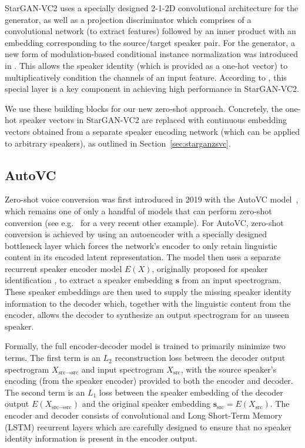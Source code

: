 StarGAN-VC2 uses a specially designed 2-1-2D convolutional architecture for the generator, as well as a projection discriminator \cite{projection_discriminator} which comprises of a convolutional network (to extract features) followed by an inner product with an embedding corresponding to the source/target speaker pair.
For the generator, a new form of modulation-based conditional instance normalization was introduced in \cite{stargan-vc2}. This allows the speaker identity (which is provided as a one-hot vector) to multiplicatively condition the channels of an input feature.
According to \cite{stargan-vc2}, this special layer is a key component in achieving high performance in StarGAN-VC2.

We use these building blocks for our new zero-shot approach. Concretely, the one-hot speaker vectors in StarGAN-VC2 are replaced with continuous embedding vectors obtained from a separate speaker encoding network (which can be applied to arbitrary speakers), as outlined in Section~\ref{sec:starganzsvc}.

\subsection{AutoVC}
\label{sec:autovc}
Zero-shot voice conversion was first introduced in 2019 with the
AutoVC model~\cite{autovc}, which remains one of only a handful of models that can perform zero-shot conversion (see e.g.\ \cite{convoice} for a very recent other example).
For AutoVC, zero-shot conversion is achieved by using an autoencoder with a specially designed bottleneck layer which forces the network's encoder to only retain linguistic content in its encoded latent representation.
The model then uses a separate recurrent speaker encoder model $E(X)$, originally proposed for speaker identification \cite{GE2E}, to extract a speaker embedding $\mathbf{s}$ from an input spectrogram.
These speaker embeddings are then used to supply the missing speaker identity information to the decoder which, together with the linguistic content from the encoder, allows the decoder to synthesize an output spectrogram for an unseen speaker. 

Formally, the full encoder-decoder model is trained to primarily minimize two terms.
The first term is an $L_2$ reconstruction loss between the decoder output spectrogram $X_{\text{src}\rightarrow\text{src}}$ and input spectrogram $X_{\text{src}}$, with the source speaker's encoding (from the speaker encoder) provided to both the encoder and decoder.
The second term is an $L_1$ loss between the speaker embedding of the decoder output $E(X_{\text{src}\rightarrow\text{src}})$ and the original speaker embedding $\mathbf{s}_\text{src} = E(X_{\text{src}})$.
The encoder and decoder consists of convolutional and Long Short-Term Memory (LSTM) \cite{lstm} recurrent layers which are carefully designed
to ensure that no speaker identity information is present in the encoder output.

